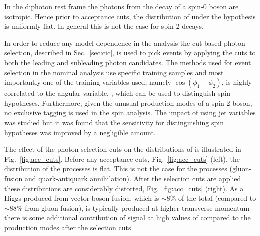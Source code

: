 In the diphoton rest frame the photons from the decay of a spin-0 boson are isotropic. Hence prior to acceptance cuts, the distribution of \costhetastar 
under the \zerop hypothesis is uniformly flat. In general this is not the case for spin-2 decays. 

In order to reduce any model dependence in the analysis the cut-based photon selection, described in Sec.~\ref{sec:cic}, is used to pick events by applying the cuts to both the leading and subleading photon candidates. The \MVA methods used for event selection in the nominal analysis use specific \SM \MC training samples and most importantly one of the training variables used, namely $\cos(\phi_{1}-\phi_{2})$, is highly correlated to the angular variable, \costhetastar, which can be used to distinguish spin hypotheses. Furthermore, given the unusual production modes of a spin-2 boson, no exclusive tagging is used in the spin analysis. The impact of using jet variables was studied but it was found that the sensitivity for distinguishing spin hypotheses was improved by a negligible amount.

The effect of the photon selection cuts on the distributions of 
\abscostheta is illustrated in Fig.~\ref{fig:acc_cuts}. Before any acceptance cuts, Fig.~\ref{fig:acc_cuts} (left), the \abscostheta
distribution of the \zerop processes is flat. This is not the case for the \twomp processes (gluon-fusion and quark-antiquark annihilation). After the selection cuts are applied these distributions are considerably distorted, Fig.~\ref{fig:acc_cuts} (right). As a Higgs produced from vector boson-fusion, which is $\sim$8\% of the total (compared to $\sim$88\% from gluon fusion),  is typically produced at higher transverse momentum there is some additional contribution of \zerop signal at high values of \abscostheta compared to the \twomp production modes after the selection cuts.

